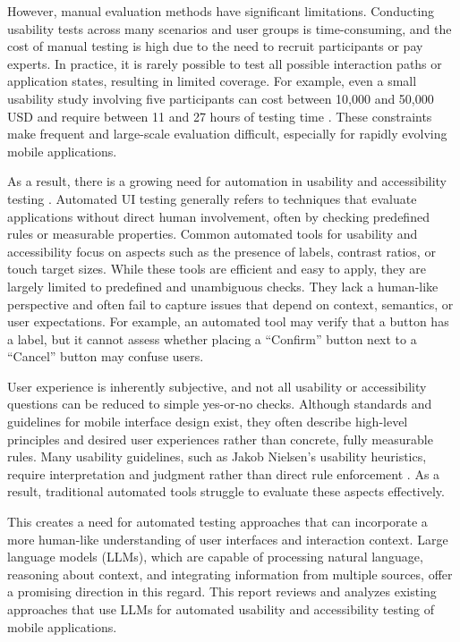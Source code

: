 \documentclass[acmsmall,nonacm]{acmart}
\begin{document}
However, manual evaluation methods have significant limitations. Conducting usability tests across many scenarios and user groups is time-consuming, and the cost of manual testing is high due to the need to recruit participants or pay experts. In practice, it is rarely possible to test all possible interaction paths or application states, resulting in limited coverage. For example, even a small usability study involving five participants can cost between 10,000 and 50,000 USD and require between 11 and 27 hours of testing time \cite{measuringu_usability_cost,nngroup_remote_costs}. These constraints make frequent and large-scale evaluation difficult, especially for rapidly evolving mobile applications.

As a result, there is a growing need for automation in usability and accessibility testing \cite{hsueh2023llm_ux_testing}. Automated UI testing generally refers to techniques that evaluate applications without direct human involvement, often by checking predefined rules or measurable properties. Common automated tools for usability and accessibility focus on aspects such as the presence of labels, contrast ratios, or touch target sizes. While these tools are efficient and easy to apply, they are largely limited to predefined and unambiguous checks. They lack a human-like perspective and often fail to capture issues that depend on context, semantics, or user expectations. For example, an automated tool may verify that a button has a label, but it cannot assess whether placing a ``Confirm'' button next to a ``Cancel'' button may confuse users.

User experience is inherently subjective, and not all usability or accessibility questions can be reduced to simple yes-or-no checks. Although standards and guidelines for mobile interface design exist, they often describe high-level principles and desired user experiences rather than concrete, fully measurable rules. Many usability guidelines, such as Jakob Nielsen's usability heuristics, require interpretation and judgment rather than direct rule enforcement \cite{nielsen1994usability_inspection}. As a result, traditional automated tools struggle to evaluate these aspects effectively.

This creates a need for automated testing approaches that can incorporate a more human-like understanding of user interfaces and interaction context. Large language models (LLMs), which are capable of processing natural language, reasoning about context, and integrating information from multiple sources, offer a promising direction in this regard. This report reviews and analyzes existing approaches that use LLMs for automated usability and accessibility testing of mobile applications.
\end{document}
